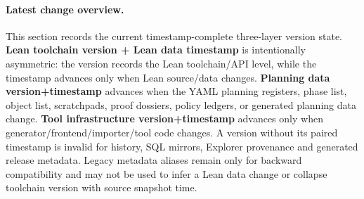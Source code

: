 \paragraph{Latest change overview.} This section records the current timestamp-complete three-layer version state. \textbf{Lean toolchain version + Lean data timestamp} is intentionally asymmetric: the version records the Lean toolchain/API level, while the timestamp advances only when Lean source/data changes. \textbf{Planning data version+timestamp} advances when the YAML planning registers, phase list, object list, scratchpads, proof dossiers, policy ledgers, or generated planning data change. \textbf{Tool infrastructure version+timestamp} advances only when generator/frontend/importer/tool code changes. A version without its paired timestamp is invalid for history, SQL mirrors, Explorer provenance and generated release metadata. Legacy metadata aliases remain only for backward compatibility and may not be used to infer a Lean data change or collapse toolchain version with source snapshot time.

